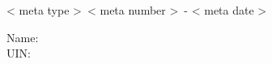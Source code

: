 \begin{center}
\Large{ {{< meta type >}}~{{< meta number >}}~- {{< meta date >}} }
\end{center}
Name:\\
UIN: